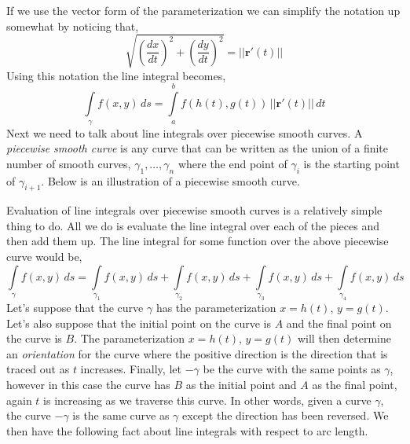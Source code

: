 \documentclass[10pt,reqno]{book}
\theoremstyle{definition}
\renewcommand{\vec}[1]{\mathbf{#1}}
\begin{document}
	If we use the vector form of the parameterization we can simplify the notation up somewhat by noticing that,
	\[ \sqrt{\left( \frac{dx}{dt} \right)^2 + \left( \frac{dy}{dt} \right)^2} = || \vec{r}'(t) || \]
	Using this notation the line integral becomes,
	\[ \int\limits_{\gamma} f(x,y)\,ds = \int\limits_a^b f(h(t),g(t))\,|| \vec{r}'(t) ||\,dt \]
	Next we need to talk about line integrals over piecewise smooth curves. A \textit{piecewise smooth curve} is any curve that can be written as the union of a finite number of smooth curves, $ \gamma_1,\ldots,\gamma_n $ where the end point of $ \gamma_i $ is the starting point of $ \gamma_{i+1} $. Below is an illustration of a piecewise smooth curve.
	\begin{center}
	\end{center}
	Evaluation of line integrals over piecewise smooth curves is a relatively simple thing to do. All we do is evaluate the line integral over each of the pieces and then add them up. The line integral for some function over the above piecewise curve would be,
	\[ \int\limits_{\gamma} f(x,y)\,ds = \int\limits_{\gamma_1} f(x,y)\,ds + \int\limits_{\gamma_2} f(x,y)\,ds + \int\limits_{\gamma_3} f(x,y)\,ds + \int\limits_{\gamma_4} f(x,y)\,ds \]
	Let's suppose that the curve $ \gamma $ has the parameterization $ x = h(t) $, $ y = g(t) $. Let's also suppose that the initial point on the curve is $ A $ and the final point on the curve is $ B $. The parameterization $ x = h(t) $, $ y = g(t) $ will then determine an \textit{orientation} for the curve where the positive direction is the direction that is traced out as $ t $ increases. Finally, let $ -\gamma $ be the curve with the same points as $ \gamma $, however in this case the curve has $ B $ as the initial point and $ A $ as the final point, again $ t $ is increasing as we traverse this curve. In other words, given a curve $ \gamma $, the curve $ -\gamma $ is the same curve as $ \gamma $ except the direction has been reversed. We then have the following fact about line integrals with respect to arc length.\\ \\
\end{document}
